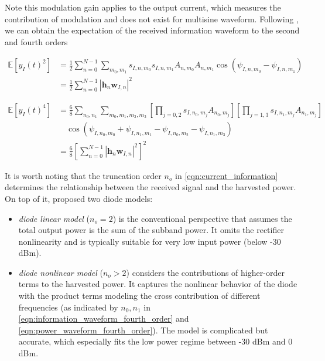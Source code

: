 Note this modulation gain applies to the output current, which measures the contribution of modulation and does not exist for multisine waveform. Following \cite{Clerckx2018}, we can obtain the expectation of the received information waveform to the second and fourth orders

\begin{align}\label{eqn:information_waveform_second_order}
  \mathbb{E}\left[ {{y_I}{{(t)}^2}} \right] &= \frac{1}{2}\sum\limits_{n = 0}^{N - 1} {\sum\limits_{{m_0},{m_1}} {{s_{I,n,{m_0}}}} } {s_{I,n,{m_1}}}{A_{n,{m_0}}}{A_{n,{m_1}}}\cos \left( {{\psi _{I,n,{m_0}}} - {\psi _{I,n,{m_1}}}} \right) \\
   &= \frac{1}{2}\sum\limits_{n = 0}^{N - 1} {{{\left| {{{\mathbf{h}}_n}{{\mathbf{w}}_{I,n}}} \right|}^2}}
\end{align}

\begin{align}\label{eqn:information_waveform_fourth_order}
  \mathbb{E}\left[ {{y_I}{{(t)}^4}} \right] &= \frac{6}{8}\sum\limits_{{n_0},{n_1}} {\sum\limits_{{m_0},{m_1},{m_2},{m_3}} {\left[ {\prod\limits_{j = 0,2} {{s_{I,{n_0},{m_j}}}{A_{{n_0},{m_j}}}} } \right]\left[ {\prod\limits_{j = 1,3} {{s_{I,{n_1},{m_j}}}{A_{{n_1},{m_j}}}} } \right]} } \nonumber \\
   &\quad \cos \left( {{\psi _{I,{n_0},{m_0}}} + {\psi _{I,{n_1},{m_1}}} - {\psi _{I,{n_0},{m_2}}} - {\psi _{I,{n_1},{m_3}}}} \right) \\
   &= \frac{6}{8}{\left[ {\sum\limits_{n = 0}^{N - 1} {{{\left| {{{\mathbf{h}}_n}{{\mathbf{w}}_{I,n}}} \right|}^2}} } \right]^2} \label{eqn:waveform_end}
\end{align}

It is worth noting that the truncation order ${n_o}$ in \eqref{eqn:current_information} determines the relationship between the received signal and the harvested power. On top of it, \cite{Clerckx2016} proposed two diode models:

\begin{itemize}
  \item \textit{diode linear model} (${n_o} = 2$) is the conventional perspective that assumes the total output power is the sum of the subband power. It omits the rectifier nonlinearity and is typically suitable for very low input power (below -30 dBm).
  \item \textit{diode nonlinear model} (${n_o} > 2$) considers the contributions of higher-order terms to the harvested power. It captures the nonlinear behavior of the diode with the product terms
      modeling the cross contribution of different frequencies (as indicated by ${{n_0},{n_1}}$ in \eqref{eqn:information_waveform_fourth_order} and \eqref{eqn:power_waveform_fourth_order}). The model is complicated but accurate, which especially fits the low power regime between -30 dBm and 0 dBm.
\end{itemize}

